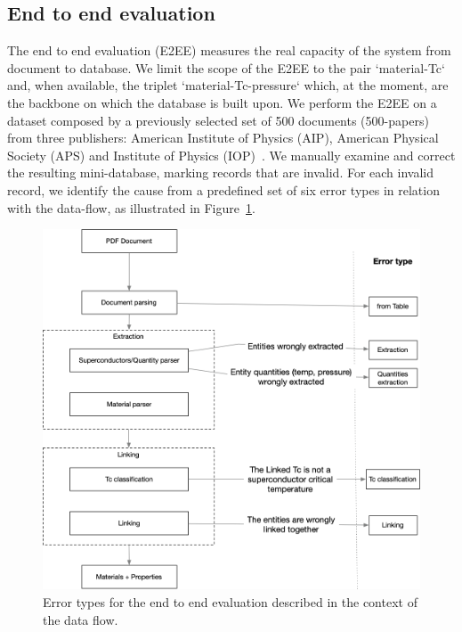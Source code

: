 \documentclass{article}
\begin{document}
\subsection{End to end evaluation}

The end to end evaluation (E2EE) measures the real capacity of the system from document to database.
We limit the scope of the E2EE to the pair `material-Tc` and, when available, the triplet `material-Tc-pressure` which, at the moment, are the backbone on which the database is built upon.
We perform the E2EE on a dataset composed by a previously selected set of 500 documents (500-papers) from three publishers: American Institute of Physics (AIP), American Physical Society (APS) and Institute of Physics (IOP)~\cite{foppiano2019proposal}.
We manually examine and correct the resulting mini-database, marking records that are invalid. For each invalid record, we identify the cause from a predefined set of six error types in relation with the data-flow, as illustrated in Figure~\ref{fig:error-types}. 

\begin{figure}[ht]
\includegraphics[width=\textwidth]{e2e-error-types}
\caption{Error types for the end to end evaluation described in the context of the data flow. }
\label{fig:error-types}
\end{figure}
\end{document}
